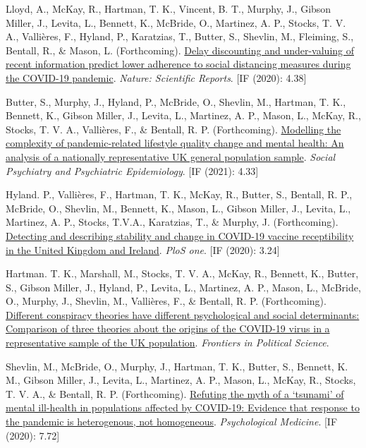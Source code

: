 \documentclass[12pt]{article}
\begin{document}
\begin{bibenum}
	\item Lloyd, A., McKay, R., Hartman, T. K., Vincent, B. T., Murphy, J., Gibson Miller, J., Levita, L., 
	Bennett, K., McBride, O.,  Martinez, A. P., Stocks, T. V. A., Vallières, F., Hyland, P., Karatzias, T., 
	Butter, S., Shevlin, M., Fleiming, S., Bentall, R., \& Mason, L.  (Forthcoming). 
		\href{https://psyarxiv.com/kvynr/}
		{Delay discounting and under-valuing of recent information predict lower adherence 
		to social distancing measures during the COVID-19 	pandemic}.
		\emph{Nature: Scientific Reports}. [IF (2020): 4.38]
		

\item Butter, S.,  Murphy, J., Hyland, P., McBride, O., Shevlin, M., Hartman, T. K., Bennett, K., Gibson Miller, J., Levita, L., Martinez, A. P., Mason, L., McKay, R., Stocks, T. V. A., Vallières, F., \& Bentall, R. P. (Forthcoming). \href{https://psyarxiv.com/2vw7d/}{Modelling the complexity of pandemic-related lifestyle quality change and mental health: An analysis of a nationally representative UK general population sample}. 
\emph{Social Psychiatry and Psychiatric Epidemiology}. [IF (2021): 4.33]
		
	\item Hyland. P., Vallières, F., Hartman, T. K., McKay, R., 
	Butter, S., Bentall, R. P., McBride, O., Shevlin, M., Bennett, K., 
	Mason, L., Gibson Miller, J., Levita, L., Martinez, A. P.,
	Stocks, T.V.A., Karatzias, T., \& Murphy, J. (Forthcoming). 
	\href{}
	{Detecting and describing stability and change in COVID-19 vaccine receptibility in the United Kingdom and Ireland}. 
	\emph{PloS one}. [IF (2020): 3.24]

	\item Hartman. T. K., Marshall, M., Stocks, T. V. A., McKay, R.,  
	Bennett, K., Butter, S., Gibson Miller, J.,  Hyland, P., Levita, L., Martinez, A. P., 
	Mason, L., McBride, O., Murphy, J., Shevlin, M., Vallières, F., 
	\& Bentall, R. P.  (Forthcoming). 
		\href{https://doi.org/10.3389/fpos.2021.642510}{Different conspiracy theories have 
		different psychological and social determinants: Comparison of three 
		theories about the origins of the COVID-19 virus in a representative 
		sample of the UK population}.
		\emph{Frontiers in Political Science}.
	
	\item Shevlin, M.,  McBride, O., Murphy, J., Hartman, T. K., Butter, S., 
	Bennett, K. M., Gibson Miller, J., Levita, L., Martinez, A. P., Mason, L., 
	McKay, R., Stocks, T. V. A.,  \& Bentall, R. P. (Forthcoming). 
		\href{https://doi.org/10.1017/S0033291721001665}{Refuting the myth 
		of a ‘tsunami’ of mental ill-health in populations affected by 
		COVID-19: Evidence that response to the pandemic is heterogenous, 
		not homogeneous}.
		\emph{Psychological Medicine}. [IF (2020): 7.72]
		

\end{bibenum}
\end{document}
